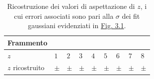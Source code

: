 \documentclass[12pt,a4paper,twoside]{report}
\begin{document}
	\begin{table}[H]
		\begin{minipage}{\textwidth}
			\centering
			\begin{tabular}{ |M{2.0cm}||M{2.0cm}|M{2.0cm}|M{2.0cm}|M{2.0cm}|M{2.0cm}|M{2.0cm}|M{2.0cm}|M{2.0cm}| }
				\hline
				Frammento &&&&&&&&\\
				\hline
				$z$ & $1$& $2$& $3$& $4$& $5$& $6$& $7$& $8$ \\
				\hline
				$z$ ricostruito & $\pm$& $\pm$ &$\pm$ &$\pm$& $\pm$& $\pm$& $\pm$& $\pm$ \\
				\hline
			\end{tabular}
		\end{minipage}
		\caption{Ricostruzione dei valori di aspettazione di $z$, i cui errori associati sono pari alla $\sigma$ dei fit gaussiani evidenziati in \hyperref[fig:atomic_numbers]{Fig. 3.1}.}
		\label{tab:atomic_numbers}
	\end{table}
	
\end{document}
